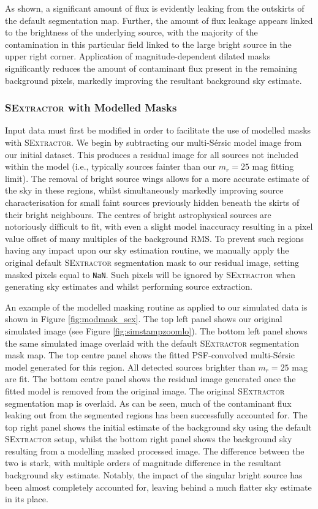 \documentclass[fleqn,usenatbib,useAMS]{mnras}
\newcommand*{\Sersic}{S\'{e}rsic\xspace}
\newcommand*{\SExtractor}{\textsc{SExtractor}\xspace}
\begin{document}
As shown, a significant amount of flux is evidently leaking from the outskirts of the default segmentation map. Further, the amount of flux leakage appears linked to the brightness of the underlying source, with the majority of the contamination in this particular field linked to the large bright source in the upper right corner. Application of magnitude-dependent dilated masks significantly reduces the amount of contaminant flux present in the remaining background pixels, markedly improving the resultant background sky estimate. 

\subsubsection{\SExtractor with Modelled Masks}
\label{sec:sextractormodelled}

Input data must first be modified in order to facilitate the use of modelled masks with \SExtractor. We begin by subtracting our multi-\Sersic model image from our initial dataset. This produces a residual image for all sources not included within the model (i.e., typically sources fainter than our $m_r=25$ mag fitting limit). The removal of bright source wings allows for a more accurate estimate of the sky in these regions, whilst simultaneously markedly improving source characterisation for small faint sources previously hidden beneath the skirts of their bright neighbours. The centres of bright astrophysical sources are notoriously difficult to fit, with even a slight model inaccuracy resulting in a pixel value offset of many multiples of the background RMS. To prevent such regions having any impact upon our sky estimation routine, we manually apply the original default \SExtractor segmentation mask to our residual image, setting masked pixels equal to \texttt{NaN}. Such pixels will be ignored by \SExtractor when generating sky estimates and whilst performing source extraction. 

An example of the modelled masking routine as applied to our simulated data is shown in Figure \ref{fig:modmask_sex}. The top left panel shows our original simulated image (see Figure \ref{fig:simstampzoomlo}). The bottom left panel shows the same simulated image overlaid with the default \SExtractor segmentation mask map. The top centre panel shows the fitted PSF-convolved multi-\Sersic model generated for this region. All detected sources brighter than $m_r=25$ mag are fit. The bottom centre panel shows the residual image generated once the fitted model is removed from the original image. The original \SExtractor segmentation map is overlaid. As can be seen, much of the contaminant flux leaking out from the segmented regions has been successfully accounted for. The top right panel shows the initial estimate of the background sky using the default \SExtractor setup, whilst the bottom right panel shows the background sky resulting from a modelling masked processed image. The difference between the two is stark, with multiple orders of magnitude difference in the resultant background sky estimate. Notably, the impact of the singular bright source has been almost completely accounted for, leaving behind a much flatter sky estimate in its place. 
\end{document}
